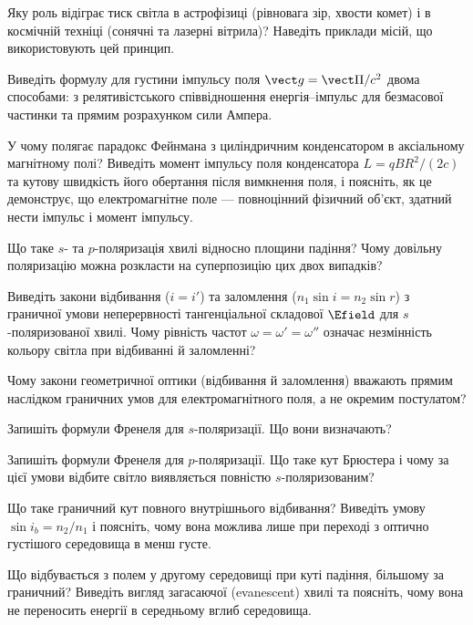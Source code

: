 \begin{Questions}
\begin{quizlist}
	\item Яку роль відіграє тиск світла в астрофізиці (рівновага зір, хвости комет) і в космічній техніці (сонячні та лазерні вітрила)? Наведіть приклади місій, що використовують цей принцип.
	\item Виведіть формулу для густини імпульсу поля $\vect g = \vect\Pi/c^2$ двома способами: з релятивістського співвідношення енергія--імпульс для безмасової частинки та прямим розрахунком сили Ампера.
	\item У чому полягає парадокс Фейнмана з циліндричним конденсатором в аксіальному магнітному полі? Виведіть момент імпульсу поля конденсатора $L=qBR^2/(2c)$ та кутову швидкість його обертання після вимкнення поля, і поясніть, як це демонструє, що електромагнітне поле --- повноцінний фізичний об'єкт, здатний нести імпульс і момент імпульсу.
	\item Що таке $s$- та $p$-поляризація хвилі відносно площини падіння? Чому довільну поляризацію можна розкласти на суперпозицію цих двох випадків?
	\item Виведіть закони відбивання ($i=i'$) та заломлення ($n_1\sin i = n_2\sin r$) з граничної умови неперервності тангенціальної складової $\Efield$ для $s$-поляризованої хвилі. Чому рівність частот $\omega=\omega'=\omega''$ означає незмінність кольору світла при відбиванні й заломленні?
	\item Чому закони геометричної оптики (відбивання й заломлення) вважають прямим наслідком граничних умов для електромагнітного поля, а не окремим постулатом?
	\item Запишіть формули Френеля для $s$-поляризації. Що вони визначають?
	\item Запишіть формули Френеля для $p$-поляризації. Що таке кут Брюстера і чому за цієї умови відбите світло виявляється повністю $s$-поляризованим?
	\item Що таке граничний кут повного внутрішнього відбивання? Виведіть умову $\sin i_b = n_2/n_1$ і поясніть, чому вона можлива лише при переході з оптично густішого середовища в менш густе.
	\item Що відбувається з полем у другому середовищі при куті падіння, більшому за граничний? Виведіть вигляд загасаючої (evanescent) хвилі та поясніть, чому вона не переносить енергії в середньому вглиб середовища.
\end{quizlist}
\end{Questions}